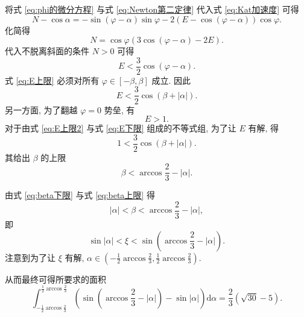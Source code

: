\documentclass{article}
\begin{document}
将式 \ref{eq:phi的微分方程} 与式 \ref{eq:Newton第二定律} 代入式 \ref{eq:Kat加速度} 可得
\begin{equation*}
	N-\cos\alpha=-\sin\!\left(\varphi-\alpha\right)\sin\varphi
	-2\left(E-\cos\!\left(\varphi-\alpha\right)\right)\cos\varphi.
\end{equation*}
化简得
\begin{equation}
	N=\cos\varphi\left(3\cos\!\left(\varphi-\alpha\right)-2E\right).
\end{equation}
代入不脱离斜面的条件 $N>0$ 可得
\begin{equation}
	\label{eq:E上限}
	E<\frac32\cos\!\left(\varphi-\alpha\right).
\end{equation}
式 \ref{eq:E上限} 必须对所有 $\varphi\in\left[-\beta,\beta\right]$ 成立.
因此
\begin{equation}
	\label{eq:E上限2}
	E<\frac32\cos\!\left(\beta+\left|\alpha\right|\right).
\end{equation}
另一方面, 为了翻越 $\varphi=0$ 势垒, 有
\begin{equation}
	\label{eq:E下限}
	E>1.
\end{equation}
对于由式 \ref{eq:E上限2} 与式 \ref{eq:E下限} 组成的不等式组, 为了让 $E$ 有解, 得
\begin{equation}
	1<\frac32\cos\!\left(\beta+\left|\alpha\right|\right).
\end{equation}
其给出 $\beta$ 的上限
\begin{equation}
	\label{eq:beta上限}
	\beta<\arccos\frac23-\left|\alpha\right|.
\end{equation}

由式 \ref{eq:beta下限} 与式 \ref{eq:beta上限} 得
\begin{equation*}
	\left|\alpha\right|<\beta<\arccos\frac23-\left|\alpha\right|,
\end{equation*}
即
\begin{equation}
	\sin\left|\alpha\right|<\xi<\sin\!\left(\arccos\frac23-\left|\alpha\right|\right).
\end{equation}
注意到为了让 $\xi$ 有解, $\alpha\in\left(-\frac12\arccos\frac23,\frac12\arccos\frac23\right)$.

从而最终可得所要求的面积
\begin{equation}
\int_{-\frac12\arccos\frac23}^{\frac12\arccos\frac23}
\left(\sin\!\left(\arccos\frac23-\left|\alpha\right|\right)-\sin\left|\alpha\right|\right)
\mathrm d\alpha=\frac23\left(\sqrt{30}-5\right).
\end{equation}
\end{document}
